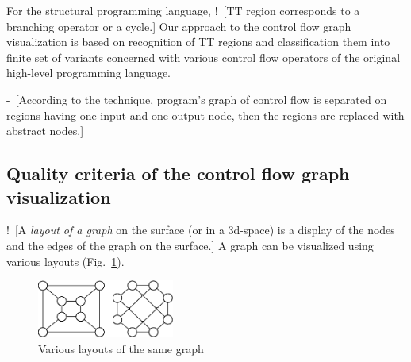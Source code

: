 \documentclass[conference]{IEEEtran}
\newcommand{\rrr}[2][rcolor]{\noindent%
\textcolor{eclr}{-\ [}\textcolor{#1}{#2}\textcolor{eclr}{]}}
\newcommand{\nnn}[2][ncolor]{\noindent%
\textcolor{eclr}{!\ [}\textcolor{#1}{#2}\textcolor{eclr}{]}}
\begin{document}
For the structural programming language, \nnn{TT region corresponds to a branching operator or a cycle.} Our approach to the control flow graph visualization is based on recognition of TT regions and classification them into finite set of variants concerned with various control flow operators of the original high-level programming language.

\rrr{According to the technique, program's graph of control flow is separated  on regions having one input and one output node, then the regions are replaced with abstract nodes.}

\subsection{Quality criteria of the control flow graph visualization}
\label{sec:qcrit}

\nnn{A \emph{layout of a graph} on the surface (or in a 3d-space) is a display of the nodes and the edges of the graph on the surface.} A graph can be visualized using various layouts (Fig.~\ref{fig:VisExample}).

\begin{figure}[b]
	\centering
		\includegraphics[width=0.4\textwidth]{Pic/Pic1.eps}
	\caption{Various layouts of the same graph}
	\label{fig:VisExample}
\end{figure}
\end{document}
